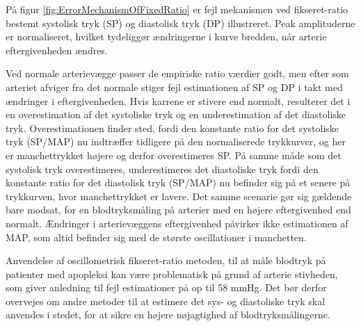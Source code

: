 \begin{minipage}[t]{0.5\textwidth}
På figur \ref{fig:ErrorMechanismOfFixedRatio} er fejl mekanismen ved fikseret-ratio bestemt systolisk tryk (SP) og diastolisk tryk (DP) illustreret. Peak amplituderne er normaliseret, hvilket tydeliggør ændringerne i kurve bredden, når arterie eftergivenheden ændres. 

Ved normale arterievægge passer de empiriske ratio værdier godt, men efter som arteriet afviger fra det normale stiger fejl estimationen af SP og DP i takt med ændringer i eftergivenheden. Hvis karrene er stivere end normalt, resulterer det i en overestimation af det systoliske tryk og en underestimation af det diastoliske tryk. Overestimationen finder sted, fordi den konstante ratio for det systoliske tryk (SP/MAP) nu indtræffer tidligere på den normaliserede trykkurver, og her er manchettrykket højere og derfor overestimeres SP. På samme måde som det systolisk tryk overestimeres, underestimeres det diastoliske tryk fordi den konstante ratio for det diastolisk tryk (SP/MAP) nu befinder sig på et senere på trykkurven, hvor manchettrykket er lavere. Det samme scenarie gør sig gældende bare modsat, for en blodtryksmåling på arterier med en højere eftergivenhed end normalt. Ændringer i arterievæggens eftergivenhed påvirker ikke estimationen af MAP, som altid befinder sig med de største oscillationer i manchetten.

Anvendelse af oscillometrisk fikseret-ratio metoden, til at måle blodtryk på patienter med apopleksi kan være problematisk på grund af arterie stivheden, som giver anledning til fejl estimationer på op til 58 mmHg. Det bør derfor overvejes om andre metoder til at estimere det sys- og diastoliske tryk skal anvendes i stedet, for at sikre en højere nøjagtighed af blodtryksmålingerne.
\end{minipage}
